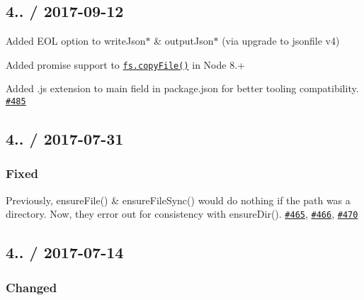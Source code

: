 \subsection*{4.. / 2017-\/09-\/12 }


\begin{DoxyItemize}
\item Added {\ttfamily E\+OL} option to {\ttfamily write\+Json$\ast$} \& {\ttfamily output\+Json$\ast$} (via upgrade to jsonfile v4)
\item Added promise support to \href{https://nodejs.org/api/fs.html#fs_fs_copyfile_src_dest_flags_callback}{\tt {\ttfamily fs.\+copy\+File()}} in Node 8.+
\item Added {\ttfamily .js} extension to {\ttfamily main} field in {\ttfamily package.\+json} for better tooling compatibility. \href{https://github.com/jprichardson/node-fs-extra/pull/485}{\tt \#485}
\end{DoxyItemize}

\subsection*{4.. / 2017-\/07-\/31 }

\subsubsection*{Fixed}


\begin{DoxyItemize}
\item Previously, {\ttfamily ensure\+File()} \& {\ttfamily ensure\+File\+Sync()} would do nothing if the path was a directory. Now, they error out for consistency with {\ttfamily ensure\+Dir()}. \href{https://github.com/jprichardson/node-fs-extra/issues/465}{\tt \#465}, \href{https://github.com/jprichardson/node-fs-extra/pull/466}{\tt \#466}, \href{https://github.com/jprichardson/node-fs-extra/issues/470}{\tt \#470}
\end{DoxyItemize}

\subsection*{4.. / 2017-\/07-\/14 }

\subsubsection*{Changed}


